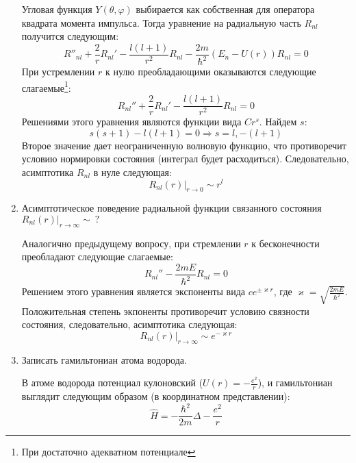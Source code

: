 \documentclass{article}
\begin{document}
\begin{enumerate}
		 Угловая функция $Y(\theta, \varphi)$ выбирается как собственная для оператора квадрата момента импульса. Тогда уравнение на радиальную часть $R_{nl}$ получится следующим:
		 \begin{equation}
		 	R''_{nl} + \frac{2}{r}R_{nl}' - \frac{l(l+1)}{r^2}R_{nl} - \frac{2m}{\hbar^2}(E_n-U(r))R_{nl} = 0
		 \end{equation}
		 При устремлении $r$ к нулю преобладающими оказываются следующие слагаемые\footnote{При достаточно адекватном потенциале}:
		 \begin{equation}
		 	R_{nl}'' +\frac{2}{r} R_{nl}' - \frac{l(l+1)}{r^2}R_{nl} = 0
		 \end{equation}
		 Решениями этого уравнения являются функции вида $Cr^s$. Найдем $s$:
		 \begin{equation}
		 	s(s+1) - l(l+1) = 0 \Rightarrow s = l, -(l+1)
		 \end{equation}
		 Второе значение дает неограниченную волновую функцию, что противоречит условию нормировки состояния (интеграл будет расходиться). Следовательно, асимптотика $R_{nl}$ в нуле следующая:
		 \begin{equation}
		 	\left.R_{nl}(r)\right|_{r \to 0} \sim r^l
		 \end{equation}
		 
		 \item {Асимптотическое поведение радиальной функции связанного состояния $\left.R_{nl}(r)\right|_{r \to \infty} \sim \ ?$}
		 
		 Аналогично предыдущему вопросу, при стремлении $r$ к бесконечности преобладают следующие слагаемые:
		 \begin{equation}
		 	R_{nl}'' - \frac{2mE}{\hbar^2}R_{nl} = 0
		 \end{equation}
		 Решением этого уравнения является экспоненты вида $c e^{\pm \varkappa r}$, где $\varkappa = \sqrt{\frac{2mE}{\hbar^2}}$. Положительная степень экпоненты противоречит условию связности состояния, следовательно, асимптотика следующая:
		 \begin{equation}
		 	\left.R_{nl}(r)\right|_{r \to \infty} \sim e^{- \varkappa r}
		 \end{equation}
		 
		 \item {Записать гамильтониан атома водорода.}
		 
		 В атоме водорода потенциал кулоновский ($U(r) = -\frac{e^2}{r}$), и гамильтониан выглядит следующим образом (в координатном представлении):
		 \begin{equation}
		 	\hat{H} = -\frac{\hbar^2}{2m}\Delta -\frac{e^2}{r}
		 \end{equation}
		 

\end{enumerate}
\end{document}
